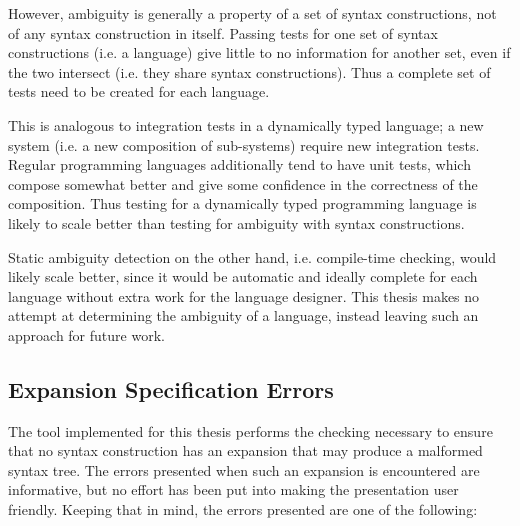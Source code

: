 \documentclass{kththesis}
\begin{document}
However, ambiguity is generally a property of a set of syntax constructions, not of any syntax construction in itself. Passing tests for one set of syntax constructions (i.e. a language) give little to no information for another set, even if the two intersect (i.e. they share syntax constructions). Thus a complete set of tests need to be created for each language.

This is analogous to integration tests in a dynamically typed language; a new system (i.e. a new composition of sub-systems) require new integration tests. Regular programming languages additionally tend to have unit tests, which compose somewhat better and give some confidence in the correctness of the composition. Thus testing for a dynamically typed programming language is likely to scale better than testing for ambiguity with syntax constructions.

Static ambiguity detection on the other hand, i.e. compile-time checking, would likely scale better, since it would be automatic and ideally complete for each language without extra work for the language designer. This thesis makes no attempt at determining the ambiguity of a language, instead leaving such an approach for future work.

\subsection{Expansion Specification Errors}

The tool implemented for this thesis performs the checking necessary to ensure that no syntax construction has an expansion that may produce a malformed syntax tree. The errors presented when such an expansion is encountered are informative, but no effort has been put into making the presentation user friendly. Keeping that in mind, the errors presented are one of the following:
\end{document}
